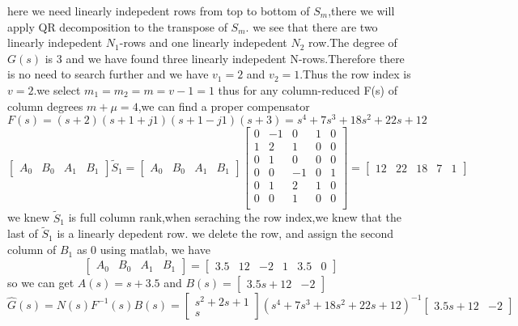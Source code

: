 \documentclass{article}
\begin{document}
here we need linearly indepedent rows from top to bottom of $S_m$,there we will apply QR decomposition to the transpose of $S_m$.
we see that there are two linearly indepedent $N_1$-rows and one linearly indepedent $N_2$ row.The degree of $G(s)$ is 3 and we have found 
three linearly indepedent N-rows.Therefore there is no need to search further and we have $v_1=2$ and $v_2=1$.Thus the row index is $v=2$.we select 
$m_1=m_2=m=v-1=1$ thus for any column-reduced F(s) of column degrees $m+\mu=4$,we can find a proper compensator
\[F(s)=(s+2)(s+1+j1)(s+1-j1)(s+3)=s^4+7s^3+18s^2+22s+12\]
\[
\left[
    \begin{array}{cccc}
        A_0 & B_0 & A_1 & B_1
    \end{array}
\right]\tilde{S}_1=
\left[
    \begin{array}{cccc}
        A_0 & B_0 & A_1 & B_1
    \end{array}
\right] 
\left[ 
        \begin{array}{ccccc}
            0 & -1 & 0 & 1 & 0 \\
            1 & 2 & 1 & 0 & 0\\
            0 & 1 & 0 & 0 & 0\\
            0 & 0 & -1 & 0 & 1\\
            0 & 1 &2 & 1 & 0 \\
            0 & 0 & 1 & 0 & 0 \\
        \end{array}
\right]=\left[ 
    \begin{array}{ccccc}
        12 & 22 & 18 & 7 & 1
    \end{array}
\right] 
\]
we knew $\tilde{S}_1$ is full column rank,when seraching the row index,we knew that the last of $\tilde{S}_1$ is a linearly depedent row.
we delete the row, and  assign the second column of $B_1$ as 0
using matlab, we have 
\[
\left[
    \begin{array}{cccc}
        A_0 & B_0 & A_1 & B_1
    \end{array}
\right]=
\left[
    \begin{array}{cccccc}
        3.5 & 12 & -2 &1 &3.5 &0
    \end{array}
\right]    
\]
so we can get $A(s)=s+3.5$ and $B(s)=\left[
    \begin{array}{cc}
        3.5s+12 & -2
    \end{array}
\right]
$\\
\[
    \hat{G}(s)=N(s)F^{-1}(s)B(s)=
    \left[
        \begin{array}{c}
            s^2+2s+1\\
            s
        \end{array}
    \right] 
    (s^4+7s^3+18s^2+22s+12)^{-1}
    \left[
        \begin{array}{cc}
            3.5s+12 & -2
        \end{array}
    \right]
\]
\end{document}
